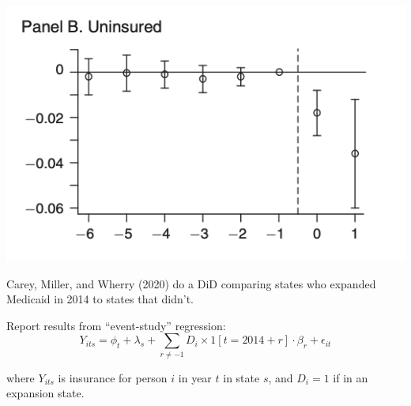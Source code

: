 \documentclass[aspectratio = 169, 13pt]{beamer}
\begin{document}
\begin{frame}
	\begin{minipage}{.5\linewidth}
			\includegraphics[width=0.99\linewidth]{Figures/Carey-event-study.png}
	\end{minipage}%
\begin{minipage}{0.5\linewidth}
	\begin{wideitemize}
	\item
	Carey, Miller, and Wherry (2020) do a DiD comparing states who expanded Medicaid in 2014 to states that didn't. 
	
	\item
	Report results from ``event-study'' regression: 
	$$Y_{its} =  \phi_{t} + \lambda_s + \sum_{r\neq -1}  D_i \times 1[t = 2014 + r] \cdot  \beta_r   + \epsilon_{it} $$
	
	\noindent where $Y_{its}$ is insurance for person $i$ in year $t$ in state $s$, and $D_i = 1$ if in an expansion state.
\end{wideitemize}
\end{minipage}


\end{frame}
\end{document}
